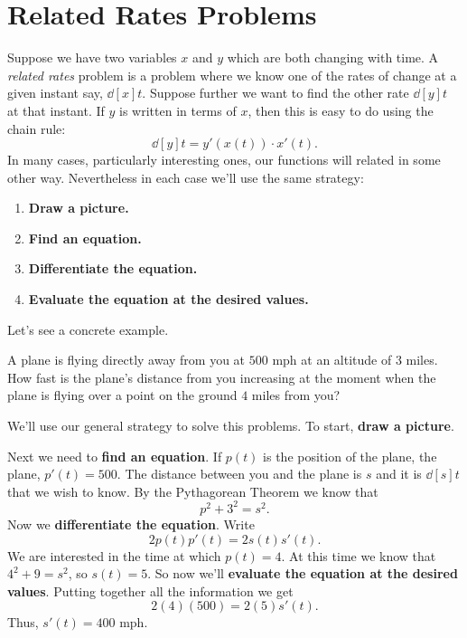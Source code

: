 \section{Related Rates Problems}

Suppose we have two variables $x$ and $y$ which are both changing with
time.  A \textit{related rates} problem is a problem where we know one
of the rates of change at a given instant say, $\dd[x]{t}$. Suppose
further we want to find the other rate $\dd[y]{t}$ at that instant.
If $y$ is written in terms of $x$, then this is easy to do using the
chain rule:
\[
\dd[y]{t}=y'(x(t))\cdot x'(t).
\]
In many cases, particularly interesting ones, our functions will 
related in some other way. Nevertheless in each case we'll use the same strategy:
\begin{enumerate}
\item \textbf{Draw a picture.}
\item \textbf{Find an equation.}
\item \textbf{Differentiate the equation.}
\item \textbf{Evaluate the equation at the desired values.} 
\end{enumerate}
Let's see a concrete example. 

\begin{example}
\label{exam:receding airplane}
A plane is flying directly away from you at $500$ mph at an altitude of
$3$ miles.  How fast is the plane's distance from you increasing at the
moment when the plane is flying over a point on the ground $4$ miles
from you?
\end{example}

\begin{solution}
We'll use our general strategy to solve this problems. To start,
\textbf{draw a picture}.


Next we need to \textbf{find an equation}.  If $p(t)$ is the
position of the plane, the plane, $p'(t)=500$. The distance between
you and the plane is $s$ and it is $\dd[s]{t}$ that we wish to
know. By the Pythagorean Theorem we know that
\[
p^2+3^2=s^2.
\] 
Now we \textbf{differentiate the equation}. Write
\[
2p(t)p'(t)  = 2s(t) s'(t).
\] 
We are interested in the time at which
$p(t)=4$. At this time we know that $4^2+9=s^2$, so $s(t)=5$. So now we'll
\textbf{evaluate the equation at the desired values}.
Putting together all the information we
get
\[
2(4)(500)=2(5)s'(t).
\]
Thus, $s'(t)=400$ mph.
\end{solution}





